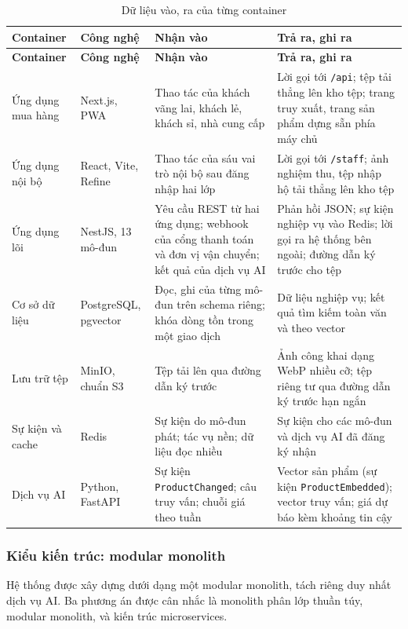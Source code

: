 \begingroup
\tblsetup\tblzebra
\begin{longtable}{L{2.60cm} L{2.30cm} L{4.80cm} L{4.85cm}}
\caption{Dữ liệu vào, ra của từng container}
\label{tab:container-io} \\
\toprule
{}
\textbf{Container} & \textbf{Công nghệ} & \textbf{Nhận vào} & \textbf{Trả ra, ghi ra} \\
\midrule
\endfirsthead
\toprule
{}
\textbf{Container} & \textbf{Công nghệ} & \textbf{Nhận vào} & \textbf{Trả ra, ghi ra} \\
\midrule
\endhead
\bottomrule
\endfoot
Ứng dụng mua hàng & Next.js, PWA & Thao tác của khách vãng lai, khách lẻ, khách sỉ, nhà cung cấp & Lời gọi tới \texttt{/api}; tệp tải thẳng lên kho tệp; trang truy xuất, trang sản phẩm dựng sẵn phía máy chủ \\
Ứng dụng nội bộ & React, Vite, Refine & Thao tác của sáu vai trò nội bộ sau đăng nhập hai lớp & Lời gọi tới \texttt{/staff}; ảnh nghiệm thu, tệp nhập hộ tải thẳng lên kho tệp \\
Ứng dụng lõi & NestJS, 13 mô-đun & Yêu cầu REST từ hai ứng dụng; webhook của cổng thanh toán và đơn vị vận chuyển; kết quả của dịch vụ AI & Phản hồi JSON; sự kiện nghiệp vụ vào Redis; lời gọi ra hệ thống bên ngoài; đường dẫn ký trước cho tệp \\
Cơ sở dữ liệu & PostgreSQL, pgvector & Đọc, ghi của từng mô-đun trên schema riêng; khóa dòng tồn trong một giao dịch & Dữ liệu nghiệp vụ; kết quả tìm kiếm toàn văn và theo vector \\
Lưu trữ tệp & MinIO, chuẩn S3 & Tệp tải lên qua đường dẫn ký trước & Ảnh công khai dạng WebP nhiều cỡ; tệp riêng tư qua đường dẫn ký trước hạn ngắn \\
Sự kiện và cache & Redis & Sự kiện do mô-đun phát; tác vụ nền; dữ liệu đọc nhiều & Sự kiện cho các mô-đun và dịch vụ AI đã đăng ký nhận \\
Dịch vụ AI & Python, FastAPI & Sự kiện \texttt{ProductChanged}; câu truy vấn; chuỗi giá theo tuần & Vector sản phẩm (sự kiện \texttt{ProductEmbedded}); vector truy vấn; giá dự báo kèm khoảng tin cậy \\
\end{longtable}
\endgroup

\subsubsection*{Kiểu kiến trúc: modular monolith}

Hệ thống được xây dựng dưới dạng một modular monolith, tách riêng duy nhất dịch vụ AI. Ba phương án được cân nhắc là monolith phân lớp thuần túy, modular monolith, và kiến trúc microservices.


